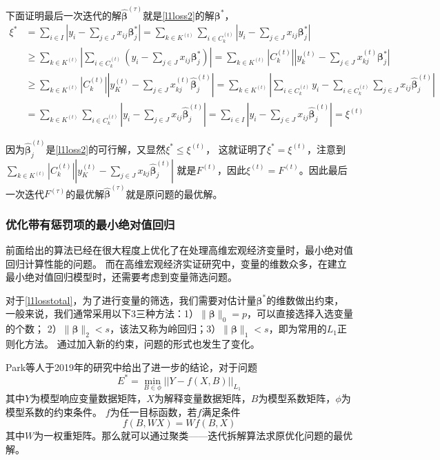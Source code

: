 下面证明最后一次迭代的解$\hat{\bm{\beta}}^{(\tau)}$就是\eqref{l1loss2}的解$\bm{\beta}^*$，
\begin{equation*}
    \begin{split}
        \xi^* & = \sum_{i \in I} |y_i - \sum_{j \in J}x_{ij}\bm{\beta}_j^*|
        = \sum_{k \in K^{(t)}}\sum_{i \in C_k^{(t)}}|y_i - \sum_{j \in J}x_{ij}\bm{\beta}_j^*| \\
        & \geq \sum_{k \in K^{(t)}}|\sum_{i\in C_k^{(t)}}(y_i - \sum_{j \in J}x_{ij}\bm{\beta}_j^*)|
        = \sum_{k \in K^{(t)}}|C_k^{(t)}||y_k^{(t)} - \sum_{j \in J}x_{kj}^{(t)}\bm{\beta}_j^*|\\
        & \geq \sum_{k \in K^{(t)}} |C_k^{(t)}||y_K^{(t)} - \sum_{j\in J}x_{kj}^{(t)} \hat{\bm{\beta}}_j^{(t)}|
        = \sum_{k \in K^{(t)}} |\sum_{i \in C_k^{(t)}} y_i - \sum_{i \in C_k^{(t)}}\sum_{j \in J}x_{ij}\hat{\bm{\beta}}_j^{(t)}| \\
        & = \sum_{k \in K^{(t)}} \sum_{i \in C_k^{(t)}}|y_i - \sum_{j \in J}x_{ij}\hat{\bm{\beta}}_j^{(t)}|
        = \sum_{i \in I}|y_i - \sum_{j \in J} x_{ij} \hat{\bm{\beta}}_j^{(t)}| 
        = \xi^{(t)}
    \end{split}
\end{equation*}

因为$\hat{\bm{\beta}}_j^{(t)}$是\eqref{l1loss2}的可行解，又显然$\xi^* \leq \xi^{(t)}$，
这就证明了$\xi^* = \xi^{(t)}$，注意到$ \sum_{k \in K^{(t)}} |C_k^{(t)}||y_K^{(t)} - \sum_{j\in J}x_{kj} \hat{\bm{\beta}}_j^{(t)}|$
就是$F^{(t)}$，因此$\xi^{(t)} = F^{(t)}$。因此最后一次迭代$F^{(\tau)}$的最优解$\hat{\bm{\beta}}^{(\tau)}$就是原问题的最优解。

\subsubsection{优化带有惩罚项的最小绝对值回归}
前面给出的算法已经在很大程度上优化了在处理高维宏观经济变量时，最小绝对值回归计算性能的问题。
而在高维宏观经济实证研究中，变量的维数众多，在建立最小绝对值回归模型时，还需要考虑到变量筛选问题。

对于\eqref{l1losstotal}，为了进行变量的筛选，我们需要对估计量$\bm{\beta}^*$的维数做出约束，
一般来说，我们通常采用以下3三种方法：1）$\|\bm{\beta}\|_0 = p$，可以直接选择入选变量的个数；
2）$\|\bm{\beta}\|_2 < s$，该法又称为岭回归；3）$\|\bm{\beta}\|_1 < s$，即为常用的$L_1$正则化方法。
通过加入新的约束，问题的形式也发生了变化。

Park等人于2019年的研究中给出了进一步的结论，对于问题
\begin{equation}\label{l1conclusion}
    E^* = \underset{B\in \phi}{\operatorname{min}} ||Y - f(X, B)||_{L_1}
\end{equation}
其中$Y$为模型响应变量数据矩阵，$X$为解释变量数据矩阵，$B$为模型系数矩阵，$\phi$为模型系数的约束条件。
$f$为任一目标函数，若$f$满足条件
\begin{equation}\label{fcondition}
    f(B, WX) = Wf(B, X)
\end{equation}
其中$W$为一权重矩阵。那么就可以通过聚类——迭代拆解算法求原优化问题的最优解。


